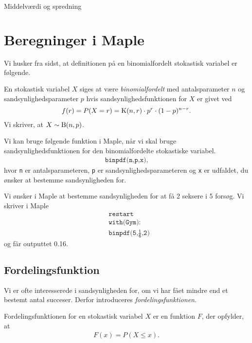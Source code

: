 \begin{center}
\Huge
Middelværdi og spredning
\end{center}
\section*{Beregninger i Maple}

Vi husker fra sidst, at definitionen på en binomialfordelt stokastisk variabel er følgende. 
\begin{defn}
	\label{def:bin}
	En stokastisk variabel $X$ siges at være \textit{binomialfordelt} med antalsparameter $n$ og sandsynlighedsparameter $p$ hvis sandsynlighedsfunktionen for $X$ er givet ved
	\begin{align*}
		f(r) = P(X = r) = \textnormal{K}(n,r)\cdot p^r\cdot (1-p)^{n-r}.
	\end{align*}
	Vi skriver, at $X \sim \textnormal{B}(n,p)$. 
\end{defn}
Vi kan bruge følgende funktion i Maple, når vi skal bruge sandsynlighedsfunktionen for den binomialfordelte stokastiske variabel.
\begin{align*}
	\texttt{binpdf(n,p,x)},
\end{align*}
hvor \texttt{n} er antalsparameteren, \texttt{p} er sandsynlighedsparameteren og \texttt{x} er udfaldet, du ønsker at bestemme sandsynligheden for.
\begin{exa}
	Vi ønsker i Maple at bestemme sandsynligheden for at få 2 seksere i 5 forsøg. Vi skriver i Maple
	\begin{align*}
		&\texttt{restart}\\
		&\texttt{with(Gym):}\\
		&\texttt{binpdf(5,$\frac{\texttt{1}}{\texttt{6}}$,2})
	\end{align*}
	og får outputtet 0.16.
\end{exa}

\subsection*{Fordelingsfunktion}

Vi er ofte interesserede i sandsynligheden for, om vi har fået mindre end et bestemt antal succeser. Derfor introduceres \textit{fordelingsfunktionen}.
\begin{defn}[Fordelingsfunktion]
	Fordelingsfunktionen for en stokastisk variabel $X$ er en funktion $F$, der opfylder, at
	\begin{align*}
		F(x) = P(X \leq x).
	\end{align*}
\end{defn}

